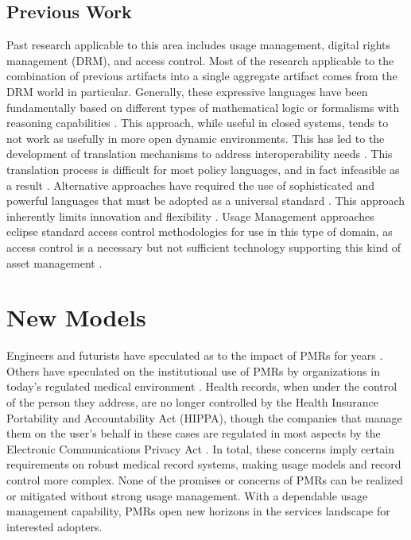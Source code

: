 \documentclass[10pt, conference, compsocconf]{IEEEtran}
\begin{document}
\subsection{Previous Work}
Past research applicable to this area includes usage management, digital rights management (DRM), and access control.  Most of the research applicable to the combination of previous artifacts into a single aggregate artifact comes from the DRM world in particular.  Generally, these expressive languages have been fundamentally based on different types of mathematical logic or formalisms with reasoning capabilities \cite{ArHu:07,BaMi:06,ChCoEtHaJoLa:03,HaWe:04,HaWe:08,PuWe:02,XiBjFu:08}.  This approach, while useful in closed systems, tends to not work as usefully in more open dynamic environments.  This has led to the development of translation mechanisms to address interoperability needs \cite{HeJa:05,PoPrDe:04,ScTaWo:04}.  This translation process is difficult for most policy languages, and in fact infeasible as a result \cite{KoLaMaMi:04,SaShUe:04}.  Alternative approaches have required the use of sophisticated and powerful languages that must be adopted as a universal standard \cite{OMADRM,ODRL-req,Wa:04,XrML-spec}.  This approach inherently limits innovation and flexibility \cite{HeJa:05,JaHe:04,JaHe:08,JaHeMa:06}.  Usage Management approaches eclipse standard access control methodologies for use in this type of domain, as access control is a necessary but not sufficient technology supporting this kind of asset management \cite{PaSa:04,BL:73,BL:76}.

\section{New Models}
Engineers and futurists have speculated as to the impact of PMRs for years \cite{Emr:Web:BestCaseEMR,Emr:Web:WorstCaseEMR}.  Others have speculated on the institutional use of PMRs by organizations in today's regulated medical environment \cite{Emr:doi:10.1056/NEJMc081118}.  Health records, when under the control of the person they address, are no longer controlled by the Health Insurance Portability and Accountability Act (HIPPA), though the companies that manage them on the user's behalf in these cases are regulated in most aspects by the Electronic Communications Privacy Act \cite{Emr:doi:10.1056/NEJMsb0800220}.  In total, these concerns imply certain requirements on robust medical record systems, making usage models and record control more complex.  None of the promises or concerns of PMRs can be realized or mitigated without strong usage management.  With a dependable usage management capability, PMRs open new horizons in the services landscape for interested adopters.
\end{document}

